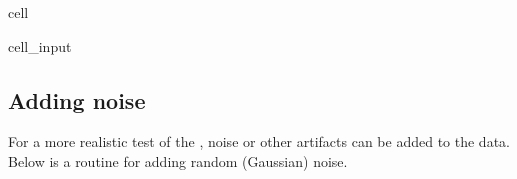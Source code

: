 \documentclass[letterpaper,table,10pt,english]{jupyterBook}
\begin{document}
\begin{sphinxuseclass}{cell}\begin{sphinxVerbatimInput}

\begin{sphinxuseclass}{cell_input}
\begin{sphinxVerbatim}[commandchars=\\\{\}]
  
\end{sphinxVerbatim}

\end{sphinxuseclass}\end{sphinxVerbatimInput}

\end{sphinxuseclass}

\subsection{Adding noise}
\label{\detokenize{part2/basic_fitting_numerics_intro_260723:adding-noise}}
\sphinxAtStartPar
For a more realistic test of the {\hyperref[\detokenize{backmatter/glossary:term-bootstrap-retrieval-protocol}]{}}, noise or other artifacts can be added to the data. Below is a routine for adding random (Gaussian) noise.
\end{document}
